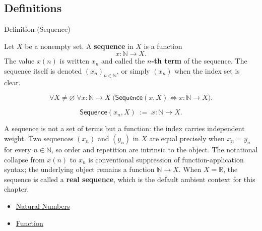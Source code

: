 
\subsection{Definitions}


\begin{definitionbox}{Definition (Sequence)}
\begin{definition}[Sequence]
\label{def:sequence}

Let $X$ be a nonempty set. A \textbf{sequence} in $X$ is a function
\[
    x : \mathbb{N} \to X.
\]
The value $x(n)$ is written $x_n$ and called the \textbf{$n$-th term} of the
sequence. The sequence itself is denoted $(x_n)_{n \in \mathbb{N}}$, or
simply $(x_n)$ when the index set is clear.
\end{definition}
\end{definitionbox}

\begin{remark*}
\[
\forall X \neq \varnothing \;\forall x : \mathbb{N} \to X
\;\bigl(\mathsf{Sequence}(x,X) \Longleftrightarrow x:\mathbb{N}\to X\bigr).
\]
\end{remark*}

\begin{remark*}
\[
\mathsf{Sequence}(x_n, X)
\;:=\;
x : \mathbb{N} \to X.
\]
\end{remark*}

\begin{remark*}[Interpretation]
A sequence is not a set of terms but a function: the index carries
independent weight. Two sequences $(x_n)$ and $(y_n)$ in $X$ are equal
precisely when $x_n = y_n$ for every $n \in \mathbb{N}$, so order and
repetition are intrinsic to the object. The notational collapse from
$x(n)$ to $x_n$ is conventional suppression of function-application
syntax; the underlying object remains a function $\mathbb{N} \to X$.
When $X = \mathbb{R}$, the sequence is called a \textbf{real sequence},
which is the default ambient context for this chapter.
\end{remark*}

\begin{dependencies}
\begin{itemize}
  \item \hyperref[def:natural-numbers]{Natural Numbers}
  \item \hyperref[def:function]{Function}
\end{itemize}
\end{dependencies}

